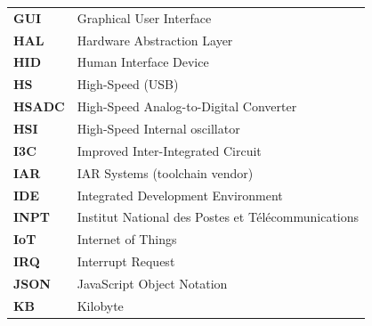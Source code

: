 \begin{tabular}{l l}
\textbf{GUI} & Graphical User Interface \\
\textbf{HAL} & Hardware Abstraction Layer \\
\textbf{HID} & Human Interface Device \\
\textbf{HS} & High-Speed (USB) \\
\textbf{HSADC} & High-Speed Analog-to-Digital Converter \\
\textbf{HSI} & High-Speed Internal oscillator \\
\textbf{I3C} & Improved Inter-Integrated Circuit \\
\textbf{IAR} & IAR Systems (toolchain vendor) \\
\textbf{IDE} & Integrated Development Environment \\
\textbf{INPT} & Institut National des Postes et T\'el\'ecommunications \\
\textbf{IoT} & Internet of Things \\
\textbf{IRQ} & Interrupt Request \\
\textbf{JSON} & JavaScript Object Notation \\
\textbf{KB} & Kilobyte \\

\end{tabular}

\pagebreak

